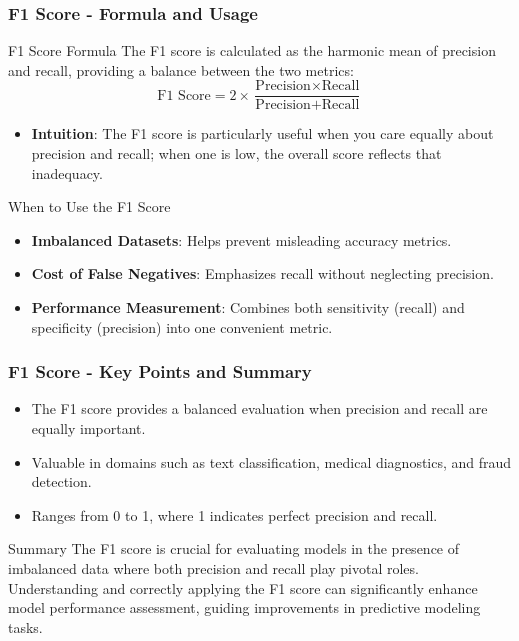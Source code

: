 \documentclass{beamer}
\begin{document}
\begin{frame}[fragile]
    \frametitle{F1 Score - Formula and Usage}
    \begin{block}{F1 Score Formula}
        The F1 score is calculated as the harmonic mean of precision and recall, providing a balance between the two metrics:
        \begin{equation}
            \text{F1 Score} = 2 \times \frac{\text{Precision} \times \text{Recall}}{\text{Precision} + \text{Recall}}
        \end{equation}
        \begin{itemize}
            \item \textbf{Intuition}: The F1 score is particularly useful when you care equally about precision and recall; when one is low, the overall score reflects that inadequacy.
        \end{itemize}
    \end{block}

    \begin{block}{When to Use the F1 Score}
        \begin{itemize}
            \item \textbf{Imbalanced Datasets}: Helps prevent misleading accuracy metrics.
            \item \textbf{Cost of False Negatives}: Emphasizes recall without neglecting precision.
            \item \textbf{Performance Measurement}: Combines both sensitivity (recall) and specificity (precision) into one convenient metric.
        \end{itemize}
    \end{block}
\end{frame}

\begin{frame}[fragile]
    \frametitle{F1 Score - Key Points and Summary}
    \begin{itemize}
        \item The F1 score provides a balanced evaluation when precision and recall are equally important.
        \item Valuable in domains such as text classification, medical diagnostics, and fraud detection.
        \item Ranges from 0 to 1, where 1 indicates perfect precision and recall.
    \end{itemize}

    \begin{block}{Summary}
        The F1 score is crucial for evaluating models in the presence of imbalanced data where both precision and recall play pivotal roles. 
        Understanding and correctly applying the F1 score can significantly enhance model performance assessment, guiding improvements in predictive modeling tasks.
    \end{block}
\end{frame}
\end{document}

